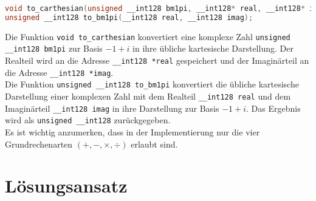 \documentclass[course=erap]{aspdoc}
\begin{document}
\begin{lstlisting}[language=C, basicstyle=\small\ttfamily]
void to_carthesian(unsigned __int128 bm1pi, __int128* real, __int128* imag);
unsigned __int128 to_bm1pi(__int128 real, __int128 imag);
\end{lstlisting}
\noindent
Die Funktion \texttt{void to\_carthesian} konvertiert eine komplexe Zahl \texttt{unsigned \_\_int128 bm1pi} zur Basis $-1 + i$ in ihre übliche kartesische Darstellung. Der Realteil wird an die Adresse \texttt{\_\_int128 *real} gespeichert und der Imaginärteil an die Adresse \texttt{\_\_int128 *imag}.\\
Die Funktion \texttt{unsigned \_\_int128 to\_bm1pi} konvertiert die übliche kartesische Darstellung einer komplexen Zahl mit dem Realteil \texttt{\_\_int128 real} und dem Imaginärteil \texttt{\_\_int128 imag} in ihre Darstellung zur Basis $-1 + i$. Das Ergebnis wird als \texttt{unsigned \_\_int128} zurückgegeben.\\
Es ist wichtig anzumerken, dass in der Implementierung nur die vier Grundrechenarten $(+, -, \times, \div)$ erlaubt sind.

\section{Lösungsansatz}
\end{document}
